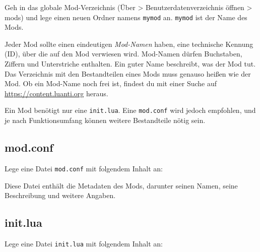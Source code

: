 Geh in das globale Mod-Verzeichnis (Über \textgreater{}
Benutzerdatenverzeichnis öffnen \textgreater{} mods) und lege einen
neuen Ordner namens \texttt{mymod} an. \texttt{mymod} ist der Name des
Mods.

Jeder Mod sollte einen eindeutigen \emph{Mod-Namen} haben, eine
technische Kennung (ID), über die auf den Mod verwiesen wird. Mod-Namen
dürfen Buchstaben, Ziffern und Unterstriche enthalten. Ein guter Name
beschreibt, was der Mod tut. Das Verzeichnis mit den Bestandteilen eines
Mods muss genauso heißen wie der Mod. Ob ein Mod-Name noch frei ist,
findest du mit einer Suche auf \url{https://content.luanti.org} heraus.

\begin{Shaded}
\begin{Highlighting}[]
\end{Highlighting}
\end{Shaded}

Ein Mod benötigt nur eine
\texttt{init.\allowbreak{}lua}.
Eine
\texttt{mod.\allowbreak{}conf}
wird jedoch empfohlen, und je nach Funktionsumfang können weitere
Bestandteile nötig sein.

\subsection{mod.conf}\label{mod.conf}

Lege eine Datei \texttt{mod.\allowbreak{}conf} mit folgendem Inhalt an:

\begin{Shaded}
\begin{Highlighting}[]
\end{Highlighting}
\end{Shaded}

Diese Datei enthält die Metadaten des Mods,
darunter seinen Namen, seine Beschreibung und weitere Angaben.

\subsection{init.lua}\label{init.lua}

Lege eine Datei \texttt{init.\allowbreak{}lua} mit folgendem Inhalt an:

